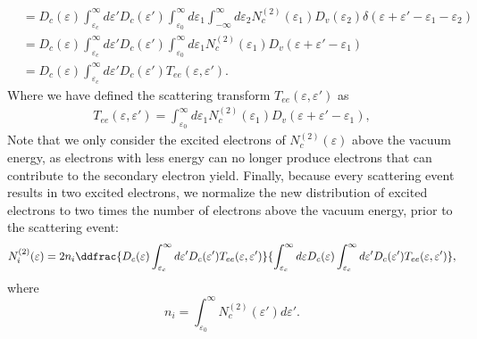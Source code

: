 \begin{refsection}
\begin{equation}
\begin{aligned}
&= D_c(\varepsilon) \int_{\varepsilon_c}^{\infty} d\varepsilon' D_c(\varepsilon') \int_{\varepsilon_0}^{\infty} d\varepsilon_1 \int_{-\infty}^{\infty} d\varepsilon_2 N_c^{(2)}(\varepsilon_1) D_v(\varepsilon_2)  \delta(\varepsilon + \varepsilon' -\varepsilon_1 - \varepsilon_2) \\
&= D_c(\varepsilon) \int_{\varepsilon_c}^{\infty} d\varepsilon' D_c(\varepsilon') \int_{\varepsilon_0}^{\infty} d\varepsilon_1 N_c^{(2)}(\varepsilon_1) D_v(\varepsilon + \varepsilon' - \varepsilon_1) \\
&= D_c(\varepsilon) \int_{\varepsilon_c}^{\infty} d\varepsilon' D_c(\varepsilon') T_{ee}(\varepsilon, \varepsilon').
\end{aligned}
\end{equation}
Where we have defined the scattering transform $T_{ee}(\varepsilon, \varepsilon')$ as
\begin{equation}
\begin{aligned}
T_{ee}(\varepsilon, \varepsilon') = \int_{\varepsilon_0}^{\infty} d\varepsilon_1 N_c^{(2)}(\varepsilon_1) D_v(\varepsilon + \varepsilon' - \varepsilon_1),
\end{aligned}
\end{equation}
Note that we only consider the excited electrons of $N_c^{(2)}(\varepsilon)$ above the vacuum energy, as electrons with less energy can no longer produce electrons that can contribute to the secondary electron yield. Finally, because every scattering event results in two excited electrons, we normalize the new distribution of excited electrons to two times the number of electrons above the vacuum energy, prior to the scattering event:
\begin{equation}
N_i^{(2)}(\varepsilon) = 2 n_i \ddfrac{D_c(\varepsilon) \int_{\varepsilon_c}^{\infty} d\varepsilon' D_c(\varepsilon') T_{ee}(\varepsilon, \varepsilon')}{\int_{\varepsilon_c}^{\infty} d\varepsilon D_c(\varepsilon) \int_{\varepsilon_c}^{\infty} d\varepsilon' D_c(\varepsilon') T_{ee}(\varepsilon, \varepsilon')},
\end{equation}
where
\begin{equation}
n_i = \int_{\varepsilon_0}^{\infty} N_c^{(2)} (\varepsilon') d\varepsilon'.
\end{equation}


\end{refsection}
